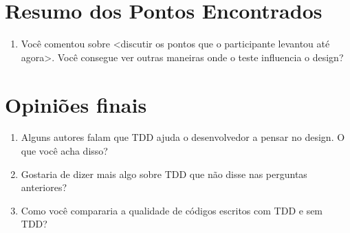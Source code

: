 \section{Resumo dos Pontos Encontrados}

\begin{enumerate}
	\item Você comentou sobre <discutir os pontos que o participante levantou até agora>. Você
	consegue ver outras maneiras onde o teste influencia o design?
\end{enumerate}

\section{Opiniões finais}

\begin{enumerate}
	\item Alguns autores falam que TDD ajuda o desenvolvedor a pensar no design. O que você acha disso?

	\item Gostaria de dizer mais algo sobre TDD que não disse nas perguntas anteriores?
	
	\item Como você compararia a qualidade de códigos escritos com TDD e sem TDD? 

\end{enumerate}

